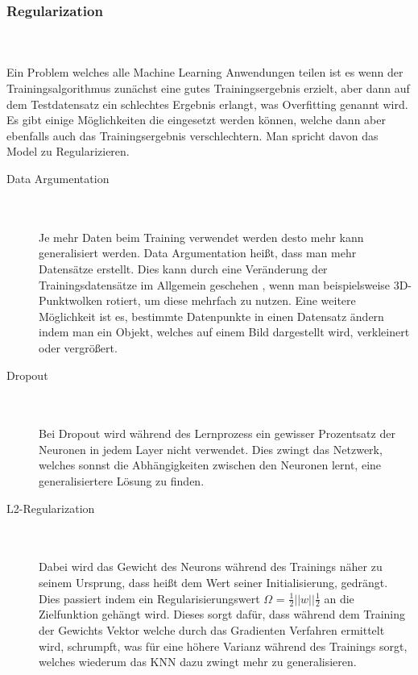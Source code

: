 \documentclass{llncs}
\begin{document}
\subsubsection{Regularization}
~\\\\
Ein Problem welches alle Machine Learning Anwendungen teilen ist es wenn der Trainingsalgorithmus zunächst eine gutes Trainingsergebnis erzielt, aber dann auf dem Testdatensatz ein schlechtes Ergebnis erlangt, was Overfitting genannt wird. Es gibt einige Möglichkeiten die eingesetzt werden können, welche dann aber ebenfalls auch das Trainingsergebnis verschlechtern. Man spricht davon das Model zu Regularizieren.

\begin{description}
\item[Data Argumentation]
~\\\\
Je mehr Daten beim Training verwendet werden desto mehr kann generalisiert werden. Data Argumentation heißt, dass man mehr Datensätze erstellt. Dies kann durch eine Veränderung der Trainingsdatensätze im Allgemein geschehen \cite{Grundlagen}, wenn man beispielsweise 3D-Punktwolken rotiert, um diese mehrfach zu nutzen. Eine weitere Möglichkeit ist es, bestimmte Datenpunkte in einen Datensatz ändern indem man ein Objekt, welches auf einem Bild dargestellt wird, verkleinert oder vergrößert\cite{Grundlagen}. \\
\item[Dropout]
~\\\\
Bei Dropout wird während des Lernprozess ein gewisser Prozentsatz der Neuronen in jedem Layer nicht verwendet. Dies zwingt das Netzwerk, welches sonnst die Abhängigkeiten zwischen den Neuronen lernt, eine generalisiertere Lösung zu finden\cite{dropout}.\\
\item[L2-Regularization]
~\\\\
Dabei wird das Gewicht des Neurons während des Trainings näher zu seinem Ursprung, dass heißt dem Wert seiner Initialisierung, gedrängt. Dies passiert indem ein Regularisierungswert $\Omega$ = $\frac{1}{2}||w||\frac{1}{2}$ an die Zielfunktion gehängt wird. Dieses sorgt dafür, dass während dem Training der Gewichts Vektor welche durch das Gradienten Verfahren ermittelt wird, schrumpft, was für eine höhere Varianz während des Trainings sorgt, welches wiederum das KNN dazu zwingt mehr zu generalisieren\cite{Grundlagen}.\\ 
\end{description}
\end{document}
